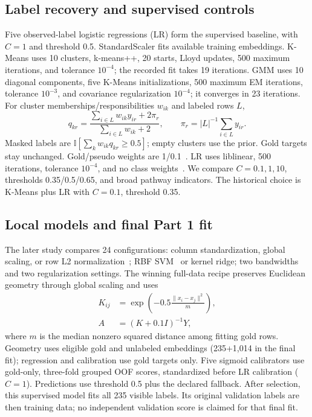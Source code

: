 \subsection{Label recovery and supervised controls}
Five observed-label logistic regressions (LR) form the supervised baseline, with $C=1$ and threshold 0.5.
StandardScaler fits available training embeddings. K-Means uses 10 clusters, k-means++, 20 starts,
Lloyd updates, 500 maximum iterations, and tolerance $10^{-4}$; the recorded fit takes 19 iterations.
GMM uses 10 diagonal components, five K-Means initializations, 500 maximum EM iterations,
tolerance $10^{-3}$, and covariance regularization $10^{-4}$; it converges in 23 iterations.
For cluster memberships/responsibilities $w_{ik}$ and labeled rows $L$,
\begin{equation}
 q_{kr}=\frac{\sum_{i\in L}w_{ik}y_{ir}+2\pi_r}{\sum_{i\in L}w_{ik}+2},\qquad
 \pi_r=|L|^{-1}\sum_{i\in L}y_{ir}.
\end{equation}
Masked labels are $\mathbb{I}[\sum_k w_{ik}q_{kr}\geq0.5]$; empty clusters use the prior.
Gold targets stay unchanged. Gold/pseudo weights are 1/0.1~\cite{lectures}.
LR uses liblinear, 500 iterations, tolerance $10^{-4}$, and no class weights~\cite{sklearn}.
We compare $C=0.1,1,10$, thresholds 0.35/0.5/0.65, and broad pathway indicators.
The historical choice is K-Means plus LR with $C=0.1$, threshold 0.35.

\subsection{Local models and final Part 1 fit}
The later study compares 24 configurations: column standardization, global scaling, or row L2 normalization~\cite{normalizer};
RBF SVM~\cite{svm} or kernel ridge; two bandwidths and two regularization settings.
The winning full-data recipe preserves Euclidean geometry through global scaling and uses
\begin{equation}
 \begin{aligned}
 K_{ij}&=\exp\!\left(-0.5\frac{\|x_i-x_j\|^2}{m}\right),\\
 A&=(K+0.1I)^{-1}Y,
 \end{aligned}
\end{equation}
where $m$ is the median nonzero squared distance among fitting gold rows.
Geometry uses eligible gold and unlabeled embeddings (235+1,014 in the final fit);
regression and calibration use gold targets only.
Five sigmoid calibrators use gold-only, three-fold grouped OOF scores, standardized
before LR calibration ($C=1$). Predictions use threshold 0.5 plus the declared fallback.
After selection, this supervised model fits all 235 visible labels. Its original validation labels
are then training data; no independent validation score is claimed for that final fit.

